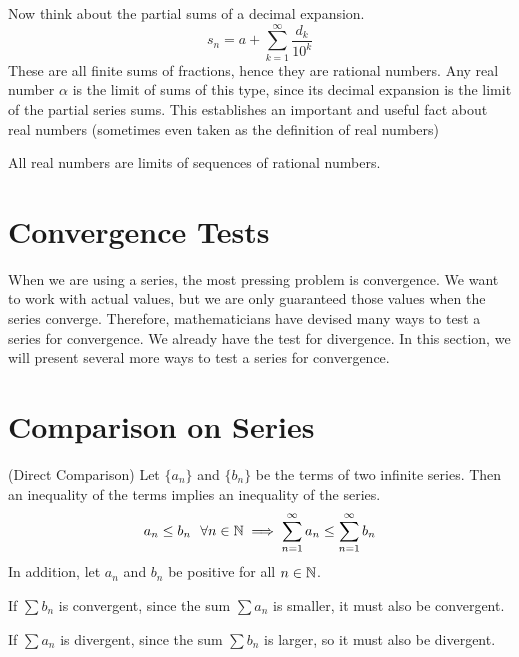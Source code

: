 \documentclass[fleqn,letterpaper]{report}
\begin{document}
Now think about the partial sums of a decimal expansion. 
\begin{equation*}
s_n = a + \sum_{k=1}^\infty \frac{d_k}{10^k}
\end{equation*}
These are all finite sums of fractions, hence they are
rational numbers. Any real number $\alpha$ is the limit of
sums of this type, since its decimal expansion is the limit of
the partial series sums. This establishes an important and
useful fact about real numbers (sometimes even taken as the
definition of real numbers)

\begin{prop}All real numbers are limits of sequences of
rational numbers.
\end{prop}

\section{Convergence Tests}
\label{convergence-tests}

When we are using a series, the most pressing problem is
convergence. We want to work with actual values, but we are
only guaranteed those values when the series converge. 
Therefore, mathematicians have devised many ways to test a
series for convergence. We already have the 
test for divergence.  In this section, we will present
several more ways to test a series for convergence.

\section{Comparison on Series}
\label{comparison}

\begin{prop}(Direct Comparison) Let $\{a_n\}$ and $\{b_n\}$ be
the terms of two infinite series. Then an inequality of the terms
implies an inequality of the series. 
\begin{equation*}
a_n \leq b_n \ \ \forall n \in \mathbb{N} \implies \sum_{n=1}^\infty a_n \leq
\sum_{n=1}^\infty b_n
\end{equation*}
In addition, let $a_n$ and $b_n$ be positive for all
$n \in \mathbb{N}$.
\begin{smallitemize}
\item If $\sum b_n$ is convergent, since the sum $\sum a_n$
is smaller, it must also be convergent.
\item If $\sum a_n$ is divergent, since the sum $\sum
b_n$ is larger, so it must also be divergent.
\end{smallitemize}
\end{prop}
\end{document}
